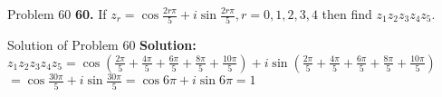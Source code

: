 \documentclass[aspectratio=169,8pt]{beamer}
\begin{document}
\begin{frame}{Problem 60}
  \textbf{60.} If $z_r = \cos\frac{2r\pi}{5} + i\sin\frac{2r\pi}{5}, r = 0, 1, 2, 3, 4$ then find $z_1z_2z_3z_4z_5.$
\end{frame}
\begin{frame}{Solution of Problem 60}
  \textbf{Solution:} $z_1z_2z_3z_4z_5 = \cos\left(\frac{2\pi}{5} + \frac{4\pi}{5} + \frac{6\pi}{5} + \frac{8\pi}{5} + \frac{10\pi}{5}\right) + i\sin\left(\frac{2\pi}{5} + \frac{4\pi}{5} + \frac{6\pi}{5} + \frac{8\pi}{5} + \frac{10\pi}{5}\right)$\\
  \vspace*{0.2cm}
  $= \cos\frac{30\pi}{5} + i\sin\frac{30\pi}{5} = \cos6\pi + i\sin6\pi = 1$
\end{frame}
\end{document}
